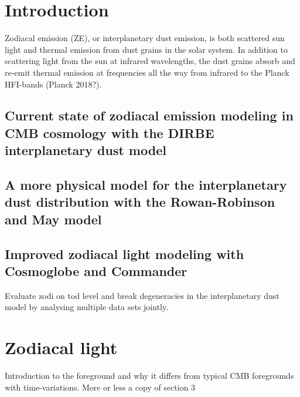 \documentclass{aa}
\begin{document}
\section{Introduction}
Zodiacal emission (ZE), or interplanetary dust emission, is both scattered sun light and thermal emission from dust grains in the solar system. In addition to scattering light from the sun at infrared wavelengths, the dust grains absorb and re-emit thermal emission at frequencies all the way from infrared to the Planck HFI-bands (Planck 2018?). 

\subsection{Current state of zodiacal emission modeling in CMB cosmology with the DIRBE interplanetary dust model}
\subsection{A more physical model for the interplanetary dust distribution with the Rowan-Robinson and May model}
\subsection{Improved zodiacal light modeling with Cosmoglobe and Commander}
Evaluate zodi on tod level and break degeneracies in the interplanetary dust model by analysing multiple data sets jointly.

\section{Zodiacal light}
Introduction to the foreground and why it differs from typical CMB foregrounds with time-variations. More or less a copy of \cite{ZODIPY} section 3
\end{document}
